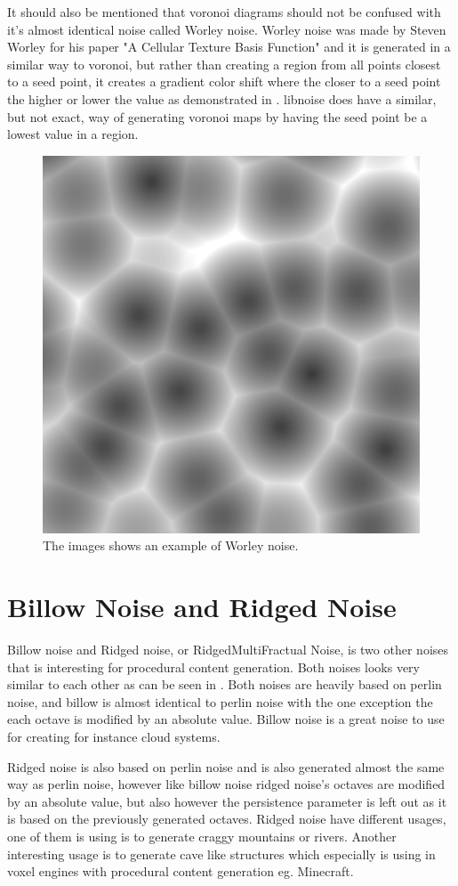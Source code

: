 It should also be mentioned that voronoi diagrams should not be confused with it's almost identical noise called Worley noise. Worley noise was made by Steven Worley for his paper "A Cellular Texture Basis Function" \cite{worley} and it is generated in a similar way to voronoi, but rather than creating a region from all points closest to a seed point, it creates a gradient color shift where the closer to a seed point the higher or lower the value as demonstrated in . libnoise does have a similar, but not exact, way of generating voronoi maps by having the seed point be a lowest value in a region.

\begin{figure}[H]
	\centering
	\includegraphics[width=0.5\linewidth]{img/worley_noise}
	\caption{The images shows an example of Worley noise.}
	\label{fig:worleynoise}
\end{figure}


\section{Billow Noise and Ridged Noise}
\label{brnoise}
Billow noise and Ridged noise, or RidgedMultiFractual Noise, is two other noises that is interesting for procedural content generation. Both noises looks very similar to each other as can be seen in . Both noises are heavily based on perlin noise, and billow is almost identical to perlin noise with the one exception the each octave is modified by an absolute value\cite{libnoiseBillow}\cite{NoiseMachineMakingNoise}. Billow noise is a great noise to use for creating for instance cloud systems.

Ridged noise is also based on perlin noise and is also generated almost the same way as perlin noise, however like billow noise ridged noise's octaves are modified by an absolute value\cite{NoiseMachineMakingNoise}, but also however the persistence parameter is left out as it is based on the previously generated octaves\cite{libnoiseRidged}. Ridged noise have different usages, one of them is using is to generate craggy mountains or rivers. Another interesting usage is to generate cave like structures which especially is using in voxel engines with procedural content generation eg. Minecraft.


